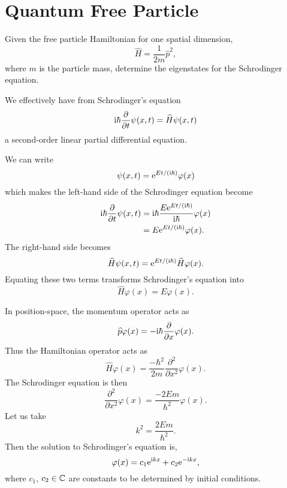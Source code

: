 \section{Quantum Free Particle}

 Given the free particle Hamiltonian for one spatial dimension,
\begin{equation}
\widehat{H} = \frac{1}{2m}\widehat{p}^{2},
\end{equation}
where $m$ is the particle mass, determine the eigenstates for the
Schrodinger equation.

\M
We effectively have from Schrodinger's equation
\begin{equation}
\mathrm{i}\hbar\frac{\partial}{\partial t}\psi(x,t) =\widehat{H}\psi(x,t)
\end{equation}
a second-order linear partial differential equation.

We can write
\begin{equation}
\psi(x,t) = \mathrm{e}^{Et/(\mathrm{i}\hbar)}\varphi(x)
\end{equation}
which makes the left-hand side of the Schrodinger equation become
\begin{equation}
\begin{split}
\mathrm{i}\hbar\frac{\partial}{\partial t}\psi(x,t) &= \mathrm{i}\hbar\frac{E\mathrm{e}^{Et/(\mathrm{i}\hbar)}}{\mathrm{i}\hbar}\varphi(x)\\
&= E \mathrm{e}^{Et/(\mathrm{i}\hbar)}\varphi(x).
\end{split}
\end{equation}
The right-hand side becomes
\begin{equation}
\widehat{H}\psi(x,t) = \mathrm{e}^{Et/(\mathrm{i}\hbar)}\widehat{H}\varphi(x).
\end{equation}
Equating these two terms transforms Schrodinger's equation into
\begin{equation}
\widehat{H}\varphi(x) = E\varphi(x).
\end{equation}

\M
In position-space, the momentum operator acts as
\begin{equation}
  \widehat{p}\varphi(x) = -\mathrm{i}\hbar\frac{\partial}{\partial x}\varphi(x).
\end{equation}
Thus the Hamiltonian operator acts as
\begin{equation}
\widehat{H}\varphi(x) = \frac{-\hbar^{2}}{2m}\frac{\partial^{2}}{\partial x^{2}}\varphi(x).
\end{equation}
The Schrodinger equation is then
\begin{equation}
\frac{\partial^{2}}{\partial x^{2}}\varphi(x) = \frac{-2Em}{\hbar^{2}}\varphi(x).
\end{equation}
Let us take
\begin{equation}
k^{2} = \frac{2Em}{\hbar^{2}}.
\end{equation}
Then the solution to Schrodinger's equation is,
\begin{equation}
\varphi(x) = c_{1}\mathrm{e}^{\mathrm{i} kx} + c_{2}\mathrm{e}^{-\mathrm{i} kx},
\end{equation}
where $c_{1}$, $c_{2}\in\mathbb{C}$ are constants to be determined by initial conditions.

